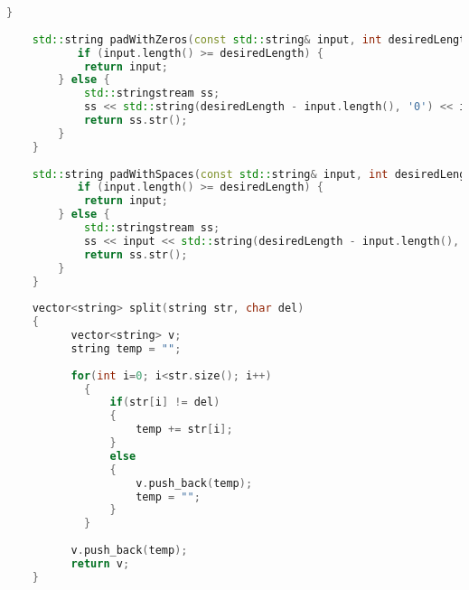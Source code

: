 \documentclass[12pt]{article}
\begin{document}
\begin{lstlisting}[language=C++, caption={Helper Functions}]
    }
    
    std::string padWithZeros(const std::string& input, int desiredLength) {
           if (input.length() >= desiredLength) {
            return input;
        } else {
            std::stringstream ss;
            ss << std::string(desiredLength - input.length(), '0') << input;
            return ss.str();
        }
    }
    
    std::string padWithSpaces(const std::string& input, int desiredLength) {
           if (input.length() >= desiredLength) {
            return input;
        } else {
            std::stringstream ss;
            ss << input << std::string(desiredLength - input.length(), ' ');
            return ss.str();
        }
    }
    
    vector<string> split(string str, char del)
    {
          vector<string> v;
          string temp = "";
       
          for(int i=0; i<str.size(); i++)
            {
                if(str[i] != del)
                {
                    temp += str[i];
                }
                else
                {
                    v.push_back(temp);
                    temp = "";
                }
            }
           
          v.push_back(temp);
          return v;
    }
\end{lstlisting}
\end{document}
